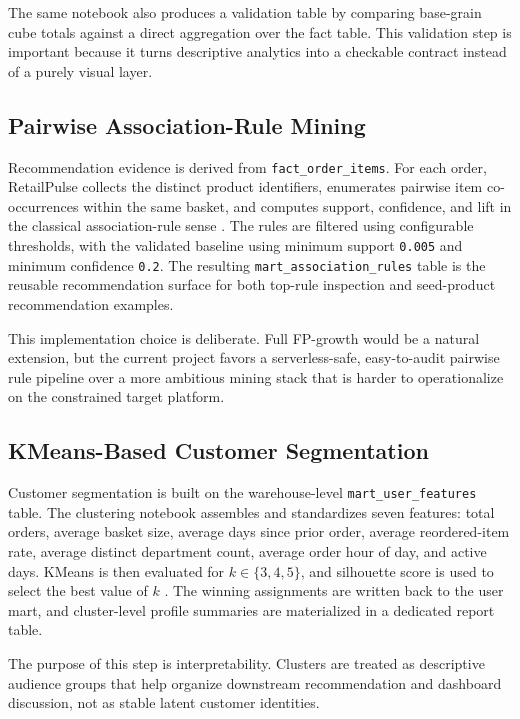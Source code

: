\documentclass[journal]{IEEEtran}
\begin{document}
The same notebook also produces a validation table by comparing base-grain cube totals against a direct aggregation over the fact table. This validation step is important because it turns descriptive analytics into a checkable contract instead of a purely visual layer.

\subsection{Pairwise Association-Rule Mining}
Recommendation evidence is derived from \texttt{fact\_order\_items}. For each order, RetailPulse collects the distinct product identifiers, enumerates pairwise item co-occurrences within the same basket, and computes support, confidence, and lift in the classical association-rule sense \cite{agrawal1994association}. The rules are filtered using configurable thresholds, with the validated baseline using minimum support \texttt{0.005} and minimum confidence \texttt{0.2}. The resulting \texttt{mart\_association\_rules} table is the reusable recommendation surface for both top-rule inspection and seed-product recommendation examples.

This implementation choice is deliberate. Full FP-growth would be a natural extension, but the current project favors a serverless-safe, easy-to-audit pairwise rule pipeline over a more ambitious mining stack that is harder to operationalize on the constrained target platform.

\subsection{KMeans-Based Customer Segmentation}
Customer segmentation is built on the warehouse-level \texttt{mart\_user\_features} table. The clustering notebook assembles and standardizes seven features: total orders, average basket size, average days since prior order, average reordered-item rate, average distinct department count, average order hour of day, and active days. KMeans is then evaluated for \(k \in \{3,4,5\}\), and silhouette score is used to select the best value of \(k\) \cite{macqueen1967kmeans,spark_ml}. The winning assignments are written back to the user mart, and cluster-level profile summaries are materialized in a dedicated report table.

The purpose of this step is interpretability. Clusters are treated as descriptive audience groups that help organize downstream recommendation and dashboard discussion, not as stable latent customer identities.
\end{document}
